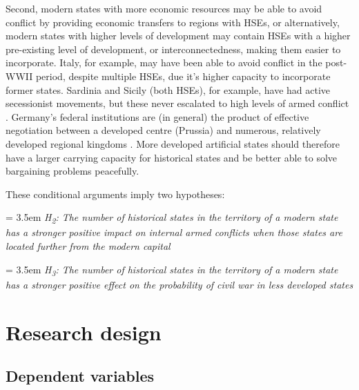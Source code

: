 Second, modern states with more economic resources may be able to avoid conflict by providing economic transfers to regions with HSEs, or alternatively, modern states with higher levels of development may contain HSEs with a higher pre-existing level of development, or interconnectedness, making them easier to incorporate. Italy, for example, may have been able to avoid conflict in the post-WWII period, despite multiple HSEs, due it's higher capacity to incorporate former states. Sardinia and Sicily (both HSEs), for example, have had active secessionist movements, but these never escalated to high levels of armed conflict \citep{Griffiths2016}. Germany's federal institutions are (in general) the product of effective negotiation between a developed centre (Prussia) and numerous, relatively developed regional kingdoms \citep{Ziblatt2008}.  More developed artificial states should therefore have a larger carrying capacity for historical states and be better able to solve bargaining problems peacefully.  

These conditional arguments imply two hypotheses:

\hangindent = 3.5em
\textit{H\textsubscript{2}: The number of historical states in the
territory of a modern state has a stronger positive impact on internal armed conflicts when those states are located further from the modern capital}

\bigskip

\hangindent = 3.5em
\textit{H\textsubscript{3}: The number of historical states in the
territory of a modern state has a stronger positive effect on the probability of civil war in less developed states}

\bigskip

 
\section{Research design}

\subsection{Dependent variables}

